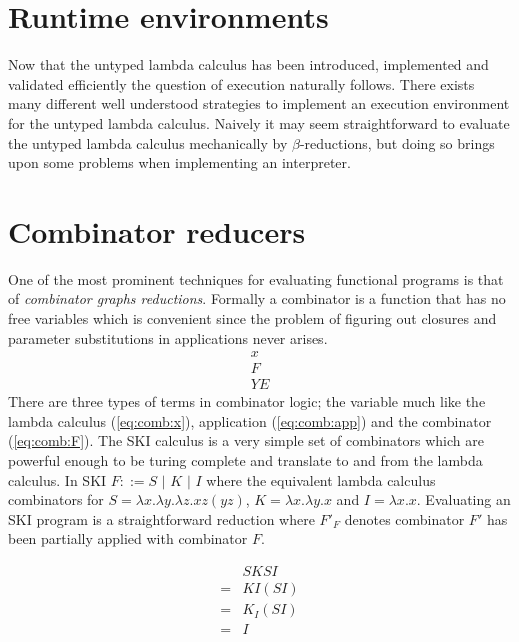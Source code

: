 \documentclass[11pt,oneside,a4paper]{report}
\begin{document}
\section{Runtime environments}
Now that the untyped lambda calculus has been introduced, implemented and validated efficiently the question of execution naturally follows.
There exists many different well understood strategies to implement an execution environment for the untyped lambda calculus.
Naively it may seem straightforward to evaluate the untyped lambda calculus mechanically by $\beta$-reductions, but doing so brings upon some problems when implementing an interpreter.

\section{Combinator reducers}
\label{sec:comb}
One of the most prominent techniques for evaluating functional programs is that of \textit{combinator graphs reductions}.
Formally a combinator is a function that has no free variables which is convenient since the problem of figuring out closures and parameter substitutions in applications never arises.
\begin{align}
    x \label{eq:comb:x}\\
    F \label{eq:comb:F}\\
    Y E \label{eq:comb:app}
\end{align}
There are three types of terms in combinator logic; the variable much like the lambda calculus (\autoref{eq:comb:x}), application (\autoref{eq:comb:app}) and the combinator (\autoref{eq:comb:F}).
The SKI calculus is a very simple set of combinators which are powerful enough to be turing complete and translate to and from the lambda calculus.
In SKI $F ::= S \,\,|\,\, K \,\,|\,\, I$ where the equivalent lambda calculus combinators for $S = \lambda x . \lambda y . \lambda z . x z (y z)$, $K = \lambda x . \lambda y . x$ and $I = \lambda x . x$.
Evaluating an SKI program is a straightforward reduction where $F'_F$ denotes combinator $F'$ has been partially applied with combinator $F$.
\begin{exmp}
    \begin{align}
        &SKSI\\
        = &KI(SI)\tag*{}\\
        = &K_I(SI)\tag*{}\\
        = &I\tag*{}
    \end{align}
\end{exmp}
\end{document}
